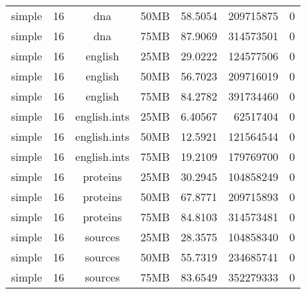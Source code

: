 \begin{table}[h]
\begin{center}
\begin{tabular}{ccccrrr}
simple & 16 & dna & 50MB & 58.5054 & 209715875 & 0 \\
simple & 16 & dna & 75MB & 87.9069 & 314573501 & 0 \\
simple & 16 & english & 25MB & 29.0222 & 124577506 & 0 \\
simple & 16 & english & 50MB & 56.7023 & 209716019 & 0 \\
simple & 16 & english & 75MB & 84.2782 & 391734460 & 0 \\
simple & 16 & english.ints & 25MB & 6.40567 & 62517404 & 0 \\
simple & 16 & english.ints & 50MB & 12.5921 & 121564544 & 0 \\
simple & 16 & english.ints & 75MB & 19.2109 & 179769700 & 0 \\
simple & 16 & proteins & 25MB & 30.2945 & 104858249 & 0 \\
simple & 16 & proteins & 50MB & 67.8771 & 209715893 & 0 \\
simple & 16 & proteins & 75MB & 84.8103 & 314573481 & 0 \\
simple & 16 & sources & 25MB & 28.3575 & 104858340 & 0 \\
simple & 16 & sources & 50MB & 55.7319 & 234685741 & 0 \\
simple & 16 & sources & 75MB & 83.6549 & 352279333 & 0 \\
\bottomrule
\end{tabular}
\caption{}
\label{tab:results}
\end{center}
\end{table}

